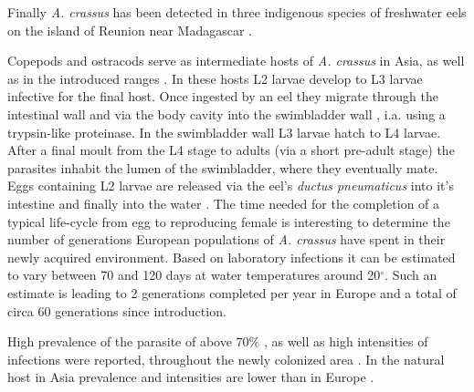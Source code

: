 Finally \textit{A. crassus} has been detected in three indigenous
species of freshwater eels on the island of Reunion near Madagascar
\cite{sasal_parasite_2008}.

Copepods and ostracods serve as intermediate hosts of
\textit{A. crassus} in Asia, as well as in the introduced ranges
\cite{moravec_first_2005}. In these hosts L2 larvae develop to L3
larvae infective for the final host. Once ingested by an eel they
migrate through the intestinal wall and via the body cavity into the
swimbladder wall \cite{haenen_effects_1996}, i.a. using a trypsin-like
proteinase\cite{polzer_identification_1993}. In the swimbladder wall
L3 larvae hatch to L4 larvae. After a final moult from the L4 stage to
adults (via a short pre-adult stage) the parasites inhabit the lumen of
the swimbladder, where they eventually mate. Eggs containing L2 larvae
are released via the eel's \textit{ductus pneumaticus} into it's
intestine and finally into the water
\cite{de_charleroy_life_1990}. The time needed for the completion of a
typical life-cycle from egg to reproducing female is interesting to
determine the number of generations European populations of
\textit{A. crassus} have spent in their newly acquired
environment. Based on laboratory infections it can be estimated to vary
between 70 and 120 days at water temperatures around 20$^{\circ}$.
Such an estimate is leading to 2 generations completed per year in
Europe and a total of circa 60 generations since introduction.



High prevalence of the parasite of above 70\%
\cite{wrtz_distribution_1998,thomas1992population}, as well as high
intensities of infections were reported, throughout the newly
colonized area \cite{lefebvre_anguillicolosis:_2004}. In the natural
host in Asia prevalence and intensities are lower than in Europe
\cite{mnderle_occurrence_2006}.


